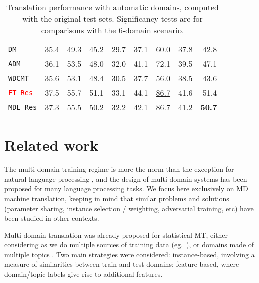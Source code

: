 \documentclass[11pt,a4paper]{article}
\newcommand{\fyDone}[1]{\done[FY]\Todo[FY:]{\textcolor{orange}{#1}}}
\newcommand{\revision}[1]{\textcolor{red}{#1}}
\newcommand{\system}[1]{\texttt{{#1}}}
\newcommand{\SB}[1]{\textbf{#1}}
\newcommand{\SW}[1]{\underline{#1}}
\begin{document}
\begin{table*}[t]
\begin{tabular}{|p{3cm}|*{8}{r|}}
    \system{DM}             & 35.4 & 49.3  & 45.2 & 29.7 & 37.1 & \SW{60.0} & 37.8 & 42.8 \\ %
    \system{ADM}           & 36.1 & 53.5  & 48.0 & 32.0 & 41.1 & 72.1 & 39.5 & 47.1\\%
    \system{WDCMT}       & 35.6 & 53.1 & 48.4 & 30.5 & \SW{37.7} & \SW{56.0} & 38.5 & 43.6 \\ %
    \revision{\system{FT Res}}     & 37.5 & 55.7  & 51.1   & 33.1   &  44.1  & \SW{86.7} & 41.6 & 51.4\\%
    \system{MDL Res}     & 37.3 & 55.5  & \SW{50.2}   & \SW{32.2}   &  \SW{42.1}  & \SW{86.7} & 41.2 & \SB{50.7}\\%
     \hline
  \end{tabular}
  \caption{Translation performance with automatic domains, computed with the original test sets. Significancy tests are for comparisons with the 6-domain scenario.}
  \label{tab:subdomains}
  \fyDone{Fill the table with correct results,}\fyDone{Change wavg and avg}
\end{table*}

\section{Related work \label{sec:related}}

The multi-domain training regime is more the norm than the exception for natural language processing \cite{Dredze08online,Finkel09hierarchical}, and the design of multi-domain systems has been proposed for many language processing tasks. We focus here exclusively on MD machine translation, keeping in mind that similar problems and solutions (parameter sharing, instance selection / weighting, adversarial training, etc) have been studied in other contexts.

Multi-domain translation was already proposed for statistical MT, either considering as we do multiple sources of training data (eg.\ \cite{Banerjee10combining,Clark12onesystem,Sennrich13multidomain,Huck15mixeddomain}), or domains made of multiple topics\fyDone{you mean multiple topics?} \cite{Eidelman12topic,Hasler14dynamic-topic}.\fyDone{Add also topic models refs} Two main strategies were considered: instance-based, involving a measure of similarities between train and test domains; feature-based, where domain/topic labels give rise to additional features. 
\end{document}
